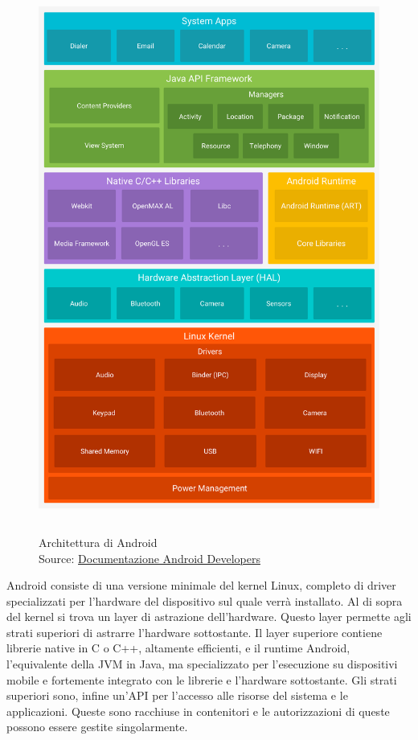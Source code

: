    \begin{figure}[H]
      \begin{center}
         \includegraphics[width=14cm,height=18cm,keepaspectratio]{immagini/android-stack}
      \end{center}
      \caption[Architettura di Android]{Architettura di Android
      \\
      Source: \href{https://developer.android.com/guide/platform/index.html}{Documentazione Android Developers}}
   \end{figure}
   Android consiste di una versione minimale del kernel Linux, completo di driver specializzati per l'hardware del dispositivo sul quale verrà installato. Al di sopra del kernel si trova un layer di astrazione dell'hardware. Questo layer permette agli strati superiori di astrarre l'hardware sottostante. Il layer superiore contiene librerie native in C o C++, altamente efficienti, e il runtime Android, l'equivalente della JVM in Java, ma specializzato per l'esecuzione su dispositivi mobile e fortemente integrato con le librerie e l'hardware sottostante. Gli strati superiori sono, infine un'API per l'accesso alle risorse del sistema e le applicazioni. Queste sono racchiuse in contenitori e le autorizzazioni di queste possono essere gestite singolarmente.

